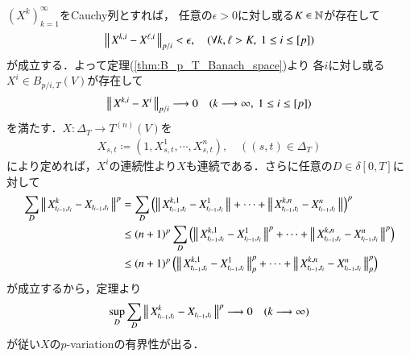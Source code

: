 \begin{prf}
	$(X^k)_{k=1}^{\infty}$をCauchy列とすれば，
	任意の$\epsilon > 0$に対し或る$K \in \mathbb{N}$が存在して
	\begin{align}
		\left\|\, X^{k,i} - X^{\ell,i}\, \right\|_{p/i} < \epsilon,
		\quad (\forall k,\ell > K,\ 1 \leq i \leq [p])
	\end{align}
	が成立する．よって定理(\ref{thm:B_p_T_Banach_space})より
	各$i$に対し或る$X^i \in B_{p/i,T}(V)$が存在して
	\begin{align}
		\left\|\, X^{k,i} - X^i\, \right\|_{p/i}
		\longrightarrow 0
		\quad (k \longrightarrow \infty,\ 1 \leq i \leq [p])
	\end{align}
	を満たす．$X:\Delta_T \longrightarrow T^{(n)}(V)$を
	\begin{align}
		X_{s,t} \coloneqq (1,X^1_{s,t},\cdots,X^n_{s,t}),
		\quad ((s,t) \in \Delta_T)
	\end{align}
	により定めれば，$X^i$の連続性より$X$も連続である．さらに任意の$D \in \delta[0,T]$に対して
	\begin{align}
		\sum_D \left\|\, X^k_{t_{i-1},t_i} - X_{t_{i-1},t_i}\, \right\|_{}^p
		&= \sum_D \left( \left\|\, X^{k,1}_{t_{i-1},t_i} - X^1_{t_{i-1},t_i}\, \right\|_{} + \cdots + \left\|\, X^{k,n}_{t_{i-1},t_i} - X^n_{t_{i-1},t_i}\, \right\|_{} \right)^p \\
		&\leq (n+1)^p \sum_D \left( \left\|\, X^{k,1}_{t_{i-1},t_i} - X^1_{t_{i-1},t_i}\, \right\|_{}^p + \cdots + \left\|\, X^{k,n}_{t_{i-1},t_i} - X^n_{t_{i-1},t_i}\, \right\|_{}^p \right) \\
		&\leq (n+1)^p \left( \left\|\, X^{k,1}_{t_{i-1},t_i} - X^1_{t_{i-1},t_i}\, \right\|_{p}^p + \cdots + \left\|\, X^{k,n}_{t_{i-1},t_i} - X^n_{t_{i-1},t_i}\, \right\|_{p}^p \right)
	\end{align}
	が成立するから，定理より
	\begin{align}
		\operatorname*{sup}_{D} \sum_D \left\|\, X^k_{t_{i-1},t_i} - X_{t_{i-1},t_i}\, \right\|_{}^p
		\longrightarrow 0 \quad (k \longrightarrow \infty)
	\end{align}
	が従い$X$の$p$-variationの有界性が出る．
	\QED
\end{prf}